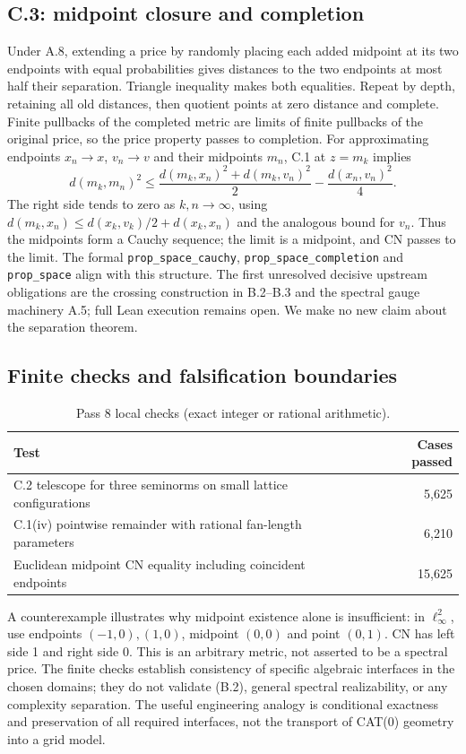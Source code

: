 \documentclass[11pt,letterpaper]{article}
\begin{document}
\subsection{C.3: midpoint closure and completion}
Under A.8, extending a price by randomly placing each added midpoint at its two endpoints with equal probabilities gives distances to the two endpoints at most half their separation. Triangle inequality makes both equalities. Repeat by depth, retaining all old distances, then quotient points at zero distance and complete. Finite pullbacks of the completed metric are limits of finite pullbacks of the original price, so the price property passes to completion. For approximating endpoints $x_n\to x$, $v_n\to v$ and their midpoints $m_n$, C.1 at $z=m_k$ implies
\[
 d(m_k,m_n)^2\le\frac{d(m_k,x_n)^2+d(m_k,v_n)^2}{2}-\frac{d(x_n,v_n)^2}{4}.
\]
The right side tends to zero as $k,n\to\infty$, using $d(m_k,x_n)\le d(x_k,v_k)/2+d(x_k,x_n)$ and the analogous bound for $v_n$. Thus the midpoints form a Cauchy sequence; the limit is a midpoint, and CN passes to the limit. The formal \texttt{prop\_space\_cauchy}, \texttt{prop\_space\_completion} and \texttt{prop\_space} align with this structure. The first unresolved decisive upstream obligations are the crossing construction in B.2--B.3 and the spectral gauge machinery A.5; full Lean execution remains open. We make no new claim about the separation theorem.

\subsection{Finite checks and falsification boundaries}
\begin{table}[htbp]
\small\centering
\caption{Pass 8 local checks (exact integer or rational arithmetic).}
\begin{tabularx}{\linewidth}{Yr}
\toprule
Test & Cases passed\\
\midrule
C.2 telescope for three seminorms on small lattice configurations & 5,625\\
C.1(iv) pointwise remainder with rational fan-length parameters & 6,210\\
Euclidean midpoint CN equality including coincident endpoints & 15,625\\
\bottomrule
\end{tabularx}
\end{table}
A counterexample illustrates why midpoint existence alone is insufficient: in $\ell_\infty^2$, use endpoints $(-1,0),(1,0)$, midpoint $(0,0)$ and point $(0,1)$. CN has left side 1 and right side 0. This is an arbitrary metric, not asserted to be a spectral price. The finite checks establish consistency of specific algebraic interfaces in the chosen domains; they do not validate (B.2), general spectral realizability, or any complexity separation. The useful engineering analogy is conditional exactness and preservation of all required interfaces, not the transport of CAT(0) geometry into a grid model.
\end{document}
